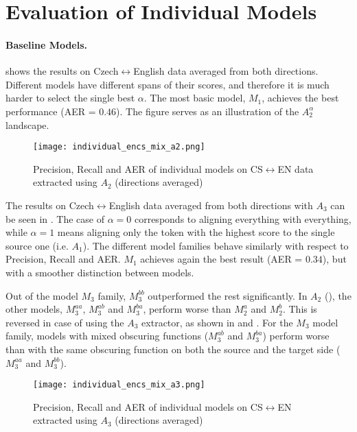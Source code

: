 \section{Evaluation of Individual Models} \label{sec:evaluation}

\paragraph{Baseline Models.}  shows the results on Czech$\leftrightarrow$English data averaged from both directions. Different models have different spans of their scores, and therefore it is much harder to select the single best $\alpha$. The most basic model, $M_1$, achieves the best performance (AER = $0.46$). The figure serves as an illustration of the $A_2^\alpha$ landscape.

\begin{figure*}[h!]
    \center
    \texttt{[image: individual\_encs\_mix\_a2.png]}
    \vspace*{-0.3cm}
    \caption{Precision, Recall and AER of individual models on CS$\leftrightarrow$EN data extracted using $A_2$ (directions averaged) \label{fig:individual_encs_mix_a2}}
\end{figure*}

The results on Czech$\leftrightarrow$English data averaged from both directions with $A_3$ can be seen in . The case of $\alpha = 0$ corresponds to aligning everything with everything, while $\alpha = 1$ means aligning only the token with the highest score to the single source one (i.e. $A_1$). The different model families behave similarly with respect to Precision, Recall and AER. $M_1$ achieves again the best result (AER = $0.34$), but with a smoother distinction between models.

Out of the model $M_3$ family, $M_3^{bb}$ outperformed the rest significantly. In $A_2$ (), the other models, $M_3^{aa}$, $M_3^{ab}$ and $M_3^{ba}$, perform worse than $M_2^a$ and $M_2^b$. This is reversed in case of using the $A_3$ extractor, as shown in  and . For the $M_3$ model family, models with mixed obscuring functions ($M_3^{ab}$ and $M_3^{ba}$) perform worse than with the same obscuring function on both the source and the target side ($M_3^{aa}$ and $M_3^{bb}$).

\begin{figure*}[h!]
    \center
    \texttt{[image: individual\_encs\_mix\_a3.png]}
    \vspace*{-0.4cm}
    \caption{Precision, Recall and AER of individual models on CS$\leftrightarrow$EN extracted using $A_3$ (directions averaged) \label{fig:individual_encs_mix_a3}}
    \vspace*{0.15cm}
\end{figure*}


